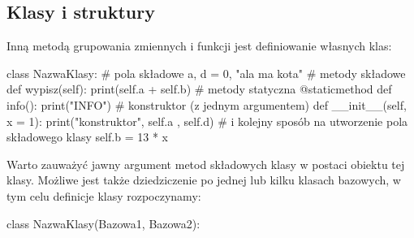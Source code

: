 % 
% 
% 
% 

\subsection{Klasy i struktury {\Symbola 🤔}}

Inną metodą grupowania zmiennych i funkcji jest definiowanie własnych klas:
\begin{CodeFrame*}[python]{}
class NazwaKlasy:
  # pola składowe
  a, d = 0, "ala ma kota"
  # metody składowe
  def wypisz(self):
    print(self.a + self.b)
  # metody statyczna
  @staticmethod
  def info():
    print("INFO")
  # konstruktor (z jednym argumentem)
  def __init__(self, x = 1):
    print("konstruktor", self.a , self.d)
    # i kolejny sposób na utworzenie pola składowego klasy
    self.b = 13 * x
\end{CodeFrame*}
Warto zauważyć jawny argument metod składowych klasy w postaci obiektu tej klasy. 
Możliwe jest także dziedziczenie po jednej lub kilku klasach bazowych, w tym celu definicje klasy rozpoczynamy:
\begin{CodeFrame*}[python]{}
class NazwaKlasy(Bazowa1, Bazowa2):
\end{CodeFrame*}

